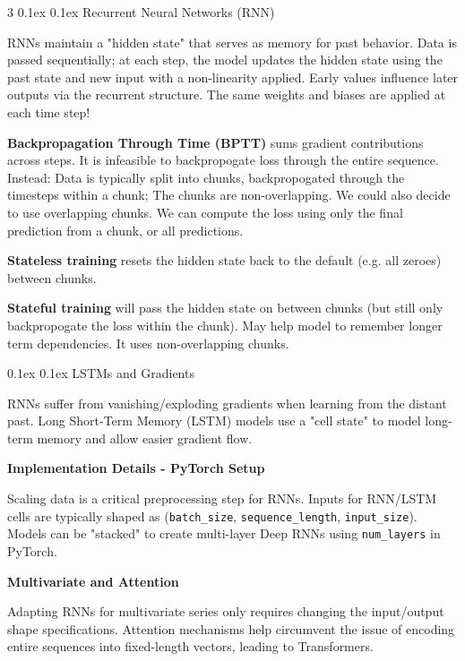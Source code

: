 \documentclass[8pt,landscape]{article}
\makeatletter
\renewcommand{\subsection}{\@startsection{subsection}{2}{0pt}%
    {0.1ex}%
    {0.1ex}%
    {\fontsize{8}{9}\bfseries\color{blue}}} %
\newcommand{\code}[1]{\textcolor{myred}{\texttt{#1}}}
\newcommand{\smalltext}[1]{
  {\fontsize{8}{9}\selectfont\sloppy #1\par}
}
\makeatother
\begin{document}
\begin{multicols}{3}
\subsection{Recurrent Neural Networks (RNN)}
\smalltext{
RNNs maintain a "hidden state" that serves as memory for past behavior. Data is passed sequentially; at each step, the model updates the hidden state using the past state and new input with a non-linearity applied. Early values influence later outputs via the recurrent structure.
The same weights and biases are applied at each time step!
}
\smalltext{
  \textbf{Backpropagation Through Time (BPTT)} sums gradient contributions across steps. 
It is infeasible to backpropogate loss through the entire sequence. Instead: Data is typically split into chunks, backpropogated through the timesteps within a chunk; The chunks are non-overlapping. We could also decide to use overlapping chunks. We can compute the loss using only the final prediction from a chunk, or all predictions.

\textbf{Stateless training} resets the hidden state back to the default (e.g. all zeroes) between chunks. 

\textbf{Stateful training} will pass the hidden state on between chunks (but still only backpropogate the loss within the chunk). May help model to remember longer term dependencies. It uses non-overlapping chunks.
}

\subsection{LSTMs and Gradients}
\smalltext{
RNNs suffer from vanishing/exploding gradients when learning from the distant past. Long Short-Term Memory (LSTM) models use a "cell state" to model long-term memory and allow easier gradient flow.
}

\textbf{Implementation Details - PyTorch Setup}
\smalltext{
Scaling data is a critical preprocessing step for RNNs. Inputs for RNN/LSTM cells are typically shaped as (\code{batch\_size}, \code{sequence\_length}, \code{input\_size}). Models can be "stacked" to create multi-layer Deep RNNs using \code{num\_layers} in PyTorch.
}
\textbf{Multivariate and Attention}
\smalltext{
Adapting RNNs for multivariate series only requires changing the input/output shape specifications. Attention mechanisms help circumvent the issue of encoding entire sequences into fixed-length vectors, leading to Transformers.
}


\end{multicols}
\end{document}
